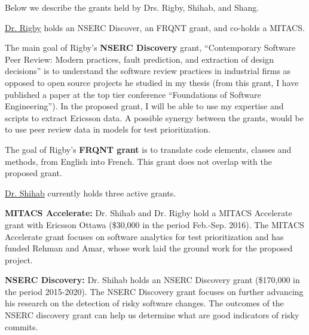 \documentclass[12pt, letterpaper]{article}
\begin{document}
\fancyhead{}
\pagestyle{fancy}
\renewcommand{\headrulewidth}{0pt}

\begin{center}
\begin{LARGE}
\noindent
{}
\end{LARGE}
\end{center}


\noindent
Below we describe the grants held by Drs. Rigby, Shihab, and Shang.

\underline{Dr. Rigby} holds an NSERC Discover, an FRQNT grant, and co-holds a MITACS.

The main goal of Rigby's \textbf{NSERC Discovery} grant, “Contemporary Software Peer Review:
Modern practices, fault prediction, and extraction of design decisions” is to
understand the software review practices in industrial firms as opposed to open
source projects he studied in my thesis (from this grant, I have published a
paper at the top tier conference “Foundations of Software Engineering”). 
%
In the proposed grant, I will be able to use my expertise and scripts to
extract Ericsson data. A possible synergy between the grants, would be to use
peer review data in models for test prioritization. 

The goal of Rigby's \textbf{FRQNT grant} is to translate code elements, classes and methods,
from English into French. This grant does not overlap with the proposed grant.

\underline{Dr. Shihab} currently holds three active grants. 

%
\textbf{MITACS Accelerate:} Dr. Shihab and Dr. Rigby hold a MITACS Accelerate grant with Ericsson Ottawa (\$30,000 in the period Feb.-Sep. 2016). The MITACS Accelerate grant focuses on software analytics for test prioritization and has funded Rehman and Amar, whose work laid the ground work for the proposed project.

\textbf{NSERC Discovery:} Dr. Shihab holds an NSERC Discovery grant (\$170,000 in the period 2015-2020). The NSERC Discovery grant focuses on further advancing his research on the detection of risky software changes. The outcomes of the NSERC discovery grant can help us determine what are good indicators of risky commits.
\end{document}
